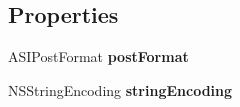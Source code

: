 \subsection*{\-Properties}
\begin{DoxyCompactItemize}
\item 
\hypertarget{interface_a_s_i_form_data_request_a0ad5abeee9bb810f180a960c1ac10ae2}{
\-A\-S\-I\-Post\-Format {\bfseries post\-Format}}
\label{interface_a_s_i_form_data_request_a0ad5abeee9bb810f180a960c1ac10ae2}

\item 
\hypertarget{interface_a_s_i_form_data_request_a67255c2a30ba48a62383a41648eb5bd2}{
\-N\-S\-String\-Encoding {\bfseries string\-Encoding}}
\label{interface_a_s_i_form_data_request_a67255c2a30ba48a62383a41648eb5bd2}

\end{DoxyCompactItemize}


